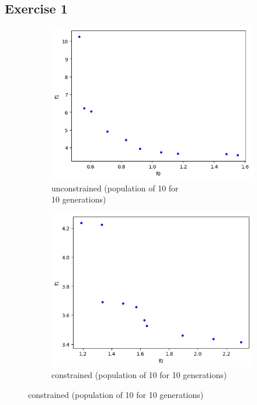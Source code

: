 \subsection{Exercise 1}
\begin{figure}[H]
    \centering
    \begin{subfigure}[t]{0.5\textwidth}
        \centering
        \includegraphics[width=\linewidth]{images/lab5/pfront_unconstrained_base.png}
        \caption{unconstrained (population of 10 for \\10 generations)}
    \end{subfigure}%
    \begin{subfigure}[t]{0.5\textwidth}
        \centering
        \includegraphics[width=\linewidth]{images/lab5/pfront_constrained_base.png}
        \caption{constrained (population of 10 for 10 generations)}
    \end{subfigure}
\end{figure}


